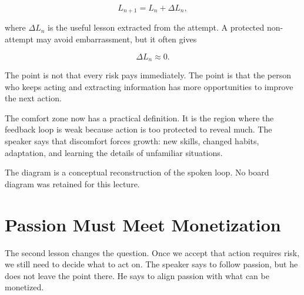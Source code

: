 \begin{equation}
L_{n+1}=L_n+\Delta L_n,
\end{equation}

where \(\Delta L_n\) is the useful lesson extracted from the attempt. A protected non-attempt may avoid embarrassment, but it often gives

\begin{equation}
\Delta L_n \approx 0.
\end{equation}

The point is not that every risk pays immediately. The point is that the person who keeps acting and extracting information has more opportunities to improve the next action.

The comfort zone now has a practical definition. It is the region where the feedback loop is weak because action is too protected to reveal much. The speaker says that discomfort forces growth: new skills, changed habits, adaptation, and learning the details of unfamiliar situations.

\begin{figure}
\centering
{}
\end{figure}

The diagram is a conceptual reconstruction of the spoken loop. No board diagram was retained for this lecture.

\section{Passion Must Meet Monetization}

The second lesson changes the question. Once we accept that action requires risk, we still need to decide what to act on. The speaker says to follow passion, but he does not leave the point there. He says to align passion with what can be monetized.

